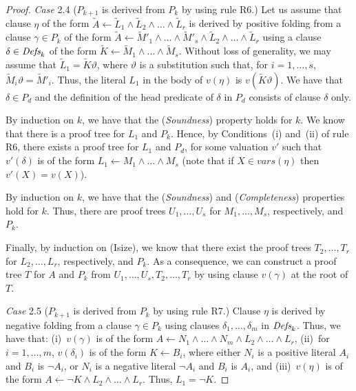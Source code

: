 \documentclass[english]{tlp}
\newcommand{\tA}{{\widetilde{A}}}
\newcommand{\tK}{{\widetilde{K}}}
\newcommand{\tL}{{\widetilde{L}}}
\newcommand{\tM}{{\widetilde{M}}}
\renewcommand{\mathit}{\displaystyle}
\begin{document}
\begin{proof}
\medskip 

\noindent \emph{Case} 2.4 ($P_{k+1}$ is derived from $P_k$ by using
rule  R6.) Let us assume that clause \( \eta  \) of the form 
$\tA \leftarrow \tL_1 \wedge\tL_2 \wedge\ldots \wedge \tL_r$
is derived by positive folding from a
clause $\gamma\in P_k$ of the form $\tA\leftarrow \tM'_1\wedge\ldots \wedge \tM'_s\wedge\tL_2 \wedge\ldots \wedge \tL_r$  using a clause $\delta\in\mbox{\it Defs}_k$ of the form
$\tK\leftarrow \tM_1\wedge\ldots \wedge \tM_s$. Without loss of generality, we may assume that $\tL_1=\tK\vartheta$, where $\vartheta$ is a substitution such that, for $i\!=\!1,\ldots,s$, $\tM_i\vartheta\!=\!\tM'_i$. Thus, the literal 
$L_1$ in the body of $v(\eta)$ is $v(\tK\vartheta)$.
We have that
$\delta\in P_d$ and the definition of the head predicate of $\delta$ in $ P_d$
consists of clause $\delta$ only. 

By induction on $k$, we have that the ({\em Soundness})
property holds for $k$. 
We know that there is a proof tree for $L_1$ and $P_k$. 
Hence, by Conditions~(i) and~(ii) of rule
R6, there exists a proof tree for $L_1$ and $P_d$, for some
valuation $v'$ such that $v'(\delta)$ is of the form $L_1\leftarrow
M_1\wedge\ldots \wedge M_s$ (note that if $X\!\in\! {\mathit{vars}}(\eta)$  then $v'(X)=v(X)$). 

By induction on $k$, we have that the ({\em Soundness}) and
({\em Completeness}) properties hold for $k$. Thus, there are proof
trees $U_1,\ldots,U_s$ for $M_1,\ldots, M_s$, respectively,  and 
$ P_k$. 

Finally, by
 induction on (Isize), we know that there exist the proof trees
$T_2,\ldots,T_r$ for $L_2,\ldots,L_r$, respectively, and $ P_{k}$.
As a consequence, we can construct a proof tree $T$ for $A$ and $
P_k$ from $U_1,\ldots,U_s,T_2,\ldots,T_r$ by using clause
$v(\gamma)$  at the root of $T$.

\medskip 

\noindent \emph{Case} 2.5 ($P_{k+1}$ is derived from $P_k$ by using
rule R7.) Clause \( \eta \) is derived by negative folding from a
clause $\gamma\in P_k$ using clauses $\delta_1,\ldots,\delta_m$ in
$\mbox{\it Defs}_k$. Thus, we have that: (i)~$v(\gamma)$ is of the
form $A\leftarrow N_1\wedge \ldots\wedge N_m\wedge
L_2\wedge\ldots\wedge L_r$, (ii)~for $i=1,\ldots,m$, $v(\delta_i)$
is of the form $K\leftarrow B_i$, where either $N_i$ is a positive
literal $A_i$ and $B_i$ is $\neg A_i$, or $N_i$ is a negative
literal $\neg A_i$ and $B_i$ is $A_i$, and (iii)~$v(\eta)$ is of the
form $A\leftarrow \neg K\wedge L_2\wedge\ldots\wedge L_r$. Thus, $L_1=\neg K$.


\end{proof}
\end{document}
